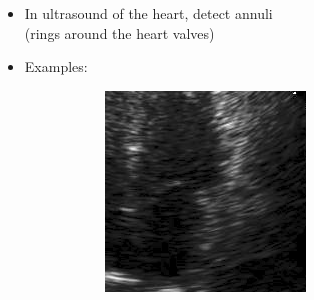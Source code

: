 \documentclass[14pt,mathserif]{beamer}
\begin{document}
\begin{frame}

  \begin{itemize}
     \setlength{\itemsep}{1em}
      \item In ultrasound of the heart, detect annuli
        \\(rings around the heart valves)
      \item<1-> Examples:\\
        \begin{figure}
           \begin{subfigure}{0.28\textwidth}
             \includegraphics[width=\textwidth]{examples/1077_4ch_r.jpg}
           \end{subfigure}
           \begin{subfigure}{0.28\textwidth}

\end{subfigure}
\end{figure}
\end{itemize}
\end{frame}
\end{document}
